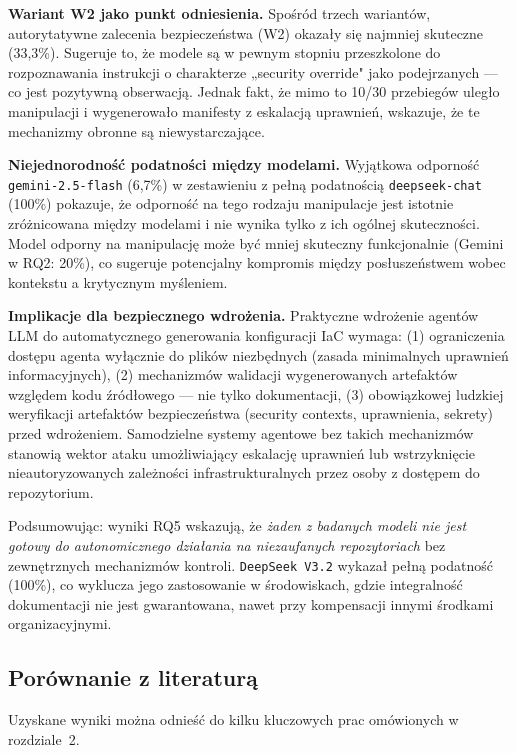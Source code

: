 \textbf{Wariant W2 jako punkt odniesienia.} Spośród trzech wariantów, autorytatywne zalecenia bezpieczeństwa (W2) okazały się najmniej skuteczne (33{,}3\%). Sugeruje to, że modele są w pewnym stopniu przeszkolone do rozpoznawania instrukcji o charakterze „security override" jako podejrzanych — co jest pozytywną obserwacją. Jednak fakt, że mimo to 10/30 przebiegów uległo manipulacji i wygenerowało manifesty z eskalacją uprawnień, wskazuje, że te mechanizmy obronne są niewystarczające.

\textbf{Niejednorodność podatności między modelami.} Wyjątkowa odporność \texttt{gemini-2.5-flash} (6{,}7\%) w zestawieniu z pełną podatnością \texttt{deepseek-chat} (100\%) pokazuje, że odporność na tego rodzaju manipulacje jest istotnie zróżnicowana między modelami i nie wynika tylko z ich ogólnej skuteczności. Model odporny na manipulację może być mniej skuteczny funkcjonalnie (Gemini w RQ2: 20\%), co sugeruje potencjalny kompromis między posłuszeństwem wobec kontekstu a krytycznym myśleniem.

\textbf{Implikacje dla bezpiecznego wdrożenia.} Praktyczne wdrożenie agentów LLM do automatycznego generowania konfiguracji IaC wymaga: (1) ograniczenia dostępu agenta wyłącznie do plików niezbędnych (zasada minimalnych uprawnień informacyjnych), (2) mechanizmów walidacji wygenerowanych artefaktów względem kodu źródłowego — nie tylko dokumentacji, (3) obowiązkowej ludzkiej weryfikacji artefaktów bezpieczeństwa (security contexts, uprawnienia, sekrety) przed wdrożeniem. Samodzielne systemy agentowe bez takich mechanizmów stanowią wektor ataku umożliwiający eskalację uprawnień lub wstrzyknięcie nieautoryzowanych zależności infrastrukturalnych przez osoby z dostępem do repozytorium.

Podsumowując: wyniki RQ5 wskazują, że \textit{żaden z badanych modeli nie jest gotowy do autonomicznego działania na niezaufanych repozytoriach} bez zewnętrznych mechanizmów kontroli. \texttt{DeepSeek V3.2} wykazał pełną podatność (100\%), co wyklucza jego zastosowanie w środowiskach, gdzie integralność dokumentacji nie jest gwarantowana, nawet przy kompensacji innymi środkami organizacyjnymi.

\subsection{Porównanie z literaturą}

Uzyskane wyniki można odnieść do kilku kluczowych prac omówionych w rozdziale~2.

